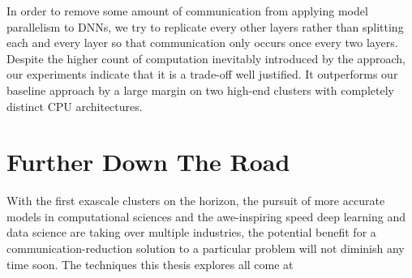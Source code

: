 In order to remove some amount of communication from applying model parallelism 
to DNNs, we try to replicate every other layers rather than splitting each and 
every layer so that communication only occurs once every two layers. Despite the 
higher count of computation inevitably introduced by the approach, our 
experiments indicate that it is a trade-off well justified. It outperforms our 
baseline approach by a large margin on two high-end clusters with completely 
distinct CPU architectures. 

\section{Further Down The Road}
With the first exascale clusters on the horizon, the pursuit of more accurate 
models in computational sciences and the awe-inspiring speed deep learning and 
data science are taking over multiple industries, the potential benefit for a 
communication-reduction solution to a particular problem will not diminish any 
time soon. The techniques this thesis explores all come at 


